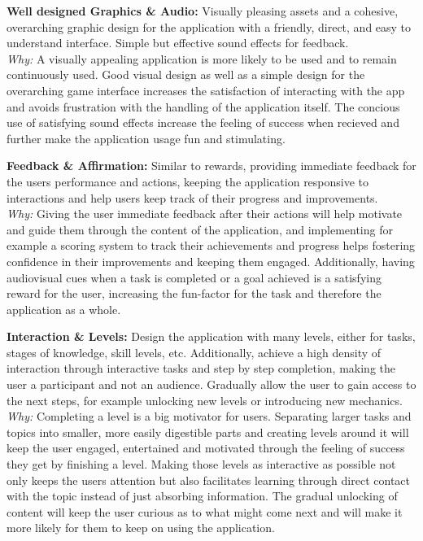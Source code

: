 \textbf{Well designed Graphics \& Audio:}
Visually pleasing assets and a cohesive, overarching graphic design for the application with a friendly, direct, and easy to understand interface. Simple but effective sound effects for feedback. \\ \indent
\textit{Why:} A visually appealing application is more likely to be used and to remain continuously used. Good visual design as well as a simple design for the overarching game interface increases the satisfaction of interacting with the app and avoids frustration with the handling of the application itself. The concious use of satisfying sound effects increase the feeling of success when recieved and further make the application usage fun and stimulating.

\textbf{Feedback \& Affirmation:}
Similar to rewards, providing immediate feedback for the users performance and actions, keeping the application responsive to interactions and help users keep track of their progress and improvements. \\ \indent
\textit{Why:} Giving the user immediate feedback after their actions will help motivate and guide them through the content of the application, and implementing for example a scoring system to track their achievements and progress helps fostering confidence in their improvements and keeping them engaged. Additionally, having audiovisual cues when a task is completed or a goal achieved is a satisfying reward for the user, increasing the fun-factor for the task and therefore the application as a whole.

\textbf{Interaction \& Levels:} 
Design the application with many levels, either for tasks, stages of knowledge, skill levels, etc. Additionally, achieve a high density of interaction through interactive tasks and step by step completion, making the user a participant and not an audience. Gradually allow the user to gain access to the next steps, for example unlocking new levels or introducing new mechanics. \\ \indent
\textit{Why:} Completing a level is a big motivator for users. Separating larger tasks and topics into smaller, more easily digestible parts and creating levels around it will keep the user engaged, entertained and motivated through the feeling of success they get by finishing a level. Making those levels as interactive as possible not only keeps the users attention but also facilitates learning through direct contact with the topic instead of just absorbing information. The gradual unlocking of content will keep the user curious as to what might come next and will make it more likely for them to keep on using the application.

